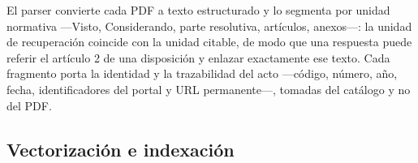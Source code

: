 \documentclass{llncs}
\begin{document}

El parser convierte cada PDF a texto estructurado y lo segmenta por unidad
normativa ---Visto, Considerando, parte resolutiva, artículos, anexos---: la
unidad de recuperación coincide con la unidad citable, de modo que una
respuesta puede referir el artículo 2 de una disposición y enlazar
exactamente ese texto. Cada fragmento porta la identidad y la trazabilidad del acto ---código,
número, año, fecha, identificadores del portal y URL permanente---, tomadas
del catálogo y no del PDF.



\subsection{Vectorización e indexación}
\label{sec:vectorizacion}
\end{document}
